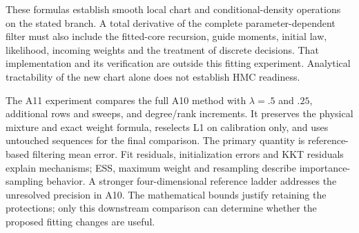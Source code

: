 These formulas establish smooth local chart and conditional-density
operations on the stated branch. A total derivative of the complete
parameter-dependent filter must also include the fitted-core recursion,
guide moments, initial law, likelihood, incoming weights and the treatment
of discrete decisions. That implementation and its verification are outside
this fitting experiment. Analytical tractability of the new chart alone
does not establish HMC readiness.

The A11 experiment compares the full A10 method with $\lambda=.5$ and
$.25$, additional rows and sweeps, and degree/rank increments. It preserves
the physical mixture and exact weight formula, reselects L1 on calibration
only, and uses untouched sequences for the final comparison. The primary
quantity is reference-based filtering mean error. Fit residuals,
initialization errors and KKT residuals explain mechanisms; ESS, maximum
weight and resampling describe importance-sampling behavior. A stronger
four-dimensional reference ladder addresses the unresolved precision in
A10. The mathematical bounds justify retaining the protections; only this
downstream comparison can determine whether the proposed fitting changes
are useful.

